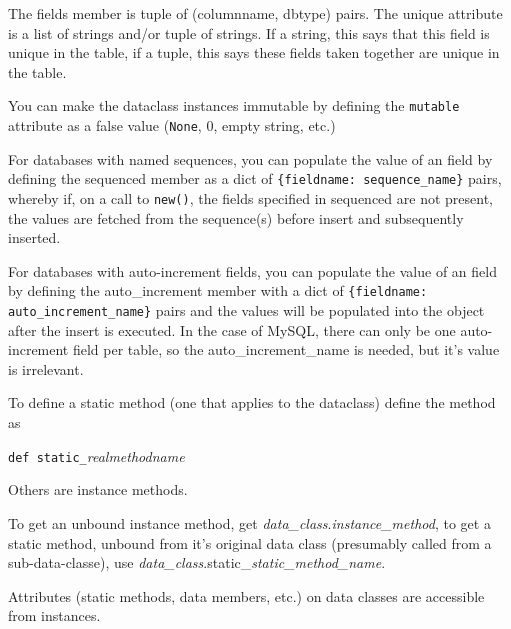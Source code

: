 \documentclass[titlepage]{manual}
\begin{document}
The fields member is tuple of (columnname, dbtype) pairs.
The unique attribute is a list of strings and/or tuple of strings.  If
a string, this says that this field is unique in the table, if a
tuple, this says these fields taken together are unique in the
table. 

You can make the dataclass instances immutable by defining the
\texttt{mutable} attribute as a false value (\texttt{None}, 0, empty
string, etc.)

For databases with named sequences, you can populate the value of an
field by defining the sequenced member as a dict of
\texttt{\{fieldname: sequence\_name\}} pairs, whereby if, on a call to
\texttt{new()}, the fields specified in sequenced are not present, the
values are fetched from the sequence(s) before insert and subsequently
inserted.

For databases with auto-increment fields, you can populate the value
of an field by defining the auto_increment member with a dict of
\texttt{\{fieldname: auto_increment\_name\}} pairs and the values will
be populated into the object after the insert is executed.  In the
case of MySQL, there can only be one auto-increment field per table,
so the auto_increment_name is needed, but it's value is irrelevant.

To define a static method (one that applies to the dataclass) define the 
method as 

\noindent
\texttt{def static\_}\emph{realmethodname}

Others are instance methods.

To get an unbound instance method, get
\emph{data\_class}.\emph{instance\_method}, to get a static method,
unbound from it's original data class (presumably called from a
sub-data-classe), use
\emph{data\_class}.static\_\emph{static\_method\_name}.

Attributes (static methods, data members, etc.) on data classes are accessible 
from instances.
\end{document}
